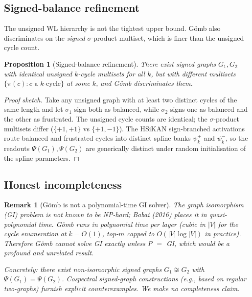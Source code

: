\documentclass[11pt,a4paper]{article}
\newtheorem{proposition}[theorem]{Proposition}
\newtheorem{remark}[theorem]{Remark}
\newcommand{\sig}{\ensuremath{\sigma}}
\newcommand{\Gomb}{G\"omb}
\begin{document}
\subsection{Signed-balance refinement}

The unsigned WL hierarchy is not the tightest upper bound. \Gomb{}
also discriminates on the \emph{signed} $\sigma$-product multiset,
which is finer than the unsigned cycle count.

\begin{proposition}[Signed-balance refinement]\label{prop:signed}
There exist signed graphs $G_1, G_2$ with identical unsigned
$k$-cycle multisets for all $k$, but with different multisets
$\{\pi(c) : c \text{ a } k\text{-cycle}\}$ at some $k$, and \Gomb{}
discriminates them.
\end{proposition}

\begin{proof}[Proof sketch]
Take any unsigned graph with at least two distinct cycles of the
same length and let $\sig_1$ sign both as balanced, while $\sig_2$
signs one as balanced and the other as frustrated. The unsigned
cycle counts are identical; the $\sigma$-product multisets differ
($\{+1, +1\}$ vs $\{+1, -1\}$). The HSiKAN sign-branched
activations route balanced and frustrated cycles into distinct
spline banks $\psi^{+}_k$ and $\psi^{-}_k$, so the readouts
$\Psi(G_1), \Psi(G_2)$ are generically distinct under random
initialisation of the spline parameters.
\end{proof}

\subsection{Honest incompleteness}

\begin{remark}[\Gomb{} is not a polynomial-time GI solver]
The graph isomorphism (GI) problem is not known to be NP-hard;
Babai (2016) places it in quasi-polynomial time. \Gomb{} runs in
polynomial time per layer (cubic in $|V|$ for the cycle enumeration
at $k = O(1)$, top-$m$ capped to $O(|V| \log |V|)$ in practice).
Therefore \Gomb{} cannot solve GI exactly unless P $=$ GI, which
would be a profound and unrelated result.

Concretely: there exist non-isomorphic signed graphs $G_1 \not\cong
G_2$ with $\Psi(G_1) = \Psi(G_2)$. Cospectral signed-graph
constructions (e.g., based on regular two-graphs) furnish explicit
counterexamples. We make no completeness claim.
\end{remark}
\end{document}
